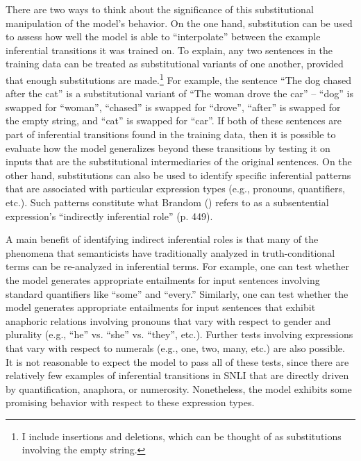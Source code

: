There are two ways to think about the significance of this substitutional manipulation of the model's behavior. On the one hand, substitution can be used to assess how well the model is able to ``interpolate'' between the example inferential transitions it was trained on. To explain, any two sentences in the training data can be treated as substitutional variants of one another, provided that enough substitutions are made.\footnote{I include insertions and deletions, which can be thought of as substitutions involving the empty string.} For example, the sentence ``The dog chased after the cat'' is a substitutional variant of ``The woman drove the car'' -- ``dog'' is swapped for ``woman'', ``chased'' is swapped for ``drove'', ``after'' is swapped for the empty string, and ``cat'' is swapped for ``car''. If both of these sentences are part of inferential transitions found in the training data, then it is possible to evaluate how the model generalizes beyond these transitions by testing it on inputs that are the substitutional intermediaries of the original sentences. On the other hand, substitutions can also be used to identify specific inferential patterns that are associated with particular expression types (e.g., pronouns, quantifiers, etc.). Such patterns constitute what Brandom (\citeyear{Brandom:1994}) refers to as a subsentential expression's ``indirectly inferential role'' (p. 449). 

A main benefit of identifying indirect inferential roles is that many of the phenomena that semanticists have traditionally analyzed in truth-conditional terms can be re-analyzed in inferential terms. For example, one can test whether the model generates appropriate entailments for input sentences involving standard quantifiers like ``some'' and ``every.'' Similarly, one can test whether the model generates appropriate entailments for input sentences that exhibit anaphoric relations involving pronouns that vary with respect to gender and plurality (e.g., ``he'' vs. ``she'' vs. ``they'', etc.). Further tests involving expressions that vary with respect to numerals (e.g., one, two, many, etc.) are also possible. It is not reasonable to expect the model to pass all of these tests, since there are relatively few examples of inferential transitions in SNLI that are directly driven by quantification, anaphora, or numerosity. Nonetheless, the model exhibits some promising behavior with respect to these expression types.

